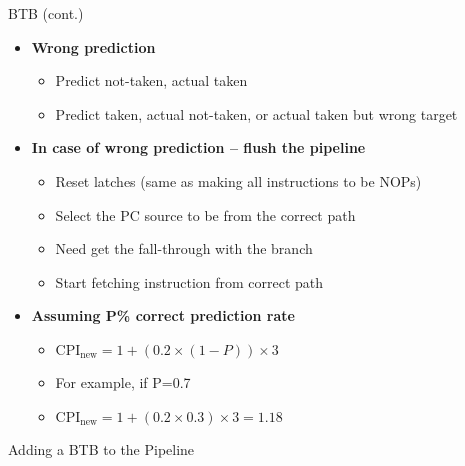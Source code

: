\documentclass[aspectratio=169,12pt]{beamer}
\begin{document}
\begin{frame}{BTB (cont.)}
    \begin{itemize}
        \item \textbf{Wrong prediction}
        \begin{itemize}
            \item Predict not-taken, actual taken
            \item Predict taken, actual not-taken, or actual taken but wrong target
        \end{itemize}
        \item \textbf{In case of wrong prediction – flush the pipeline}
        \begin{itemize}
            \item Reset latches (same as making all instructions to be NOPs)
            \item Select the PC source to be from the correct path
            \item Need get the fall-through with the branch
            \item Start fetching instruction from correct path
        \end{itemize}
        \item \textbf{Assuming P\% correct prediction rate}
        \begin{itemize}
            \item $\text{CPI}_{\text{new}} = 1 + (0.2 \times (1-P)) \times 3$
            \item For example, if P=0.7
            \item $\text{CPI}_{\text{new}} = 1 + (0.2 \times 0.3) \times 3 = 1.18$
        \end{itemize}
    \end{itemize}
\end{frame}

\begin{frame}{Adding a BTB to the Pipeline}
    \centering
\end{frame}
\end{document}
